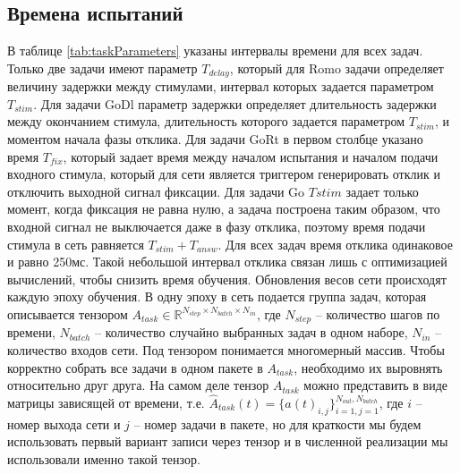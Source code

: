 \documentclass{article}
\begin{document}
\subsection{Времена испытаний}\label{label:times}
В таблице \ref{tab:taskParameters} указаны интервалы времени для всех задач. Только две задачи имеют параметр $T_{delay}$, который для Romo задачи определяет величину задержки между стимулами, интервал которых задается параметром $T_{stim}$. Для задачи GoDl параметр задержки определяет длительность задержки между окончанием стимула, длительность которого задается параметром $T_{stim}$, и моментом начала фазы отклика. Для задачи GoRt в первом столбце указано время $T_{fix}$, который задает время между началом испытания и началом подачи входного стимула, который для сети является триггером генерировать отклик и отключить выходной сигнал фиксации. Для задачи Go $T{stim}$ задает только момент, когда фиксация не равна нулю, а задача построена таким образом, что входной сигнал не выключается даже в фазу отклика, поэтому время подачи стимула в сеть равняется $T_{stim} + T_{answ}$. Для всех задач время отклика одинаковое и равно 250мс. Такой небольшой интервал отклика связан лишь с оптимизацией вычислений, чтобы снизить время обучения. Обновления весов сети происходят каждую эпоху обучения. В одну эпоху в сеть подается группа задач, которая описывается тензором $A_{task} \in \mathbb{R}^{N_{step} \times N_{batch} \times N_{in}}$, где $N_{step}$ -- количество шагов по времени, $N_{batch}$ -- количество случайно выбранных задач в одном наборе, $N_{in}$ -- количество входов сети. Под тензором понимается многомерный массив. Чтобы корректно собрать все задачи в одном пакете в $A_{task}$, необходимо их выровнять относительно друг друга. На самом деле тензор $A_{task}$ можно представить в виде матрицы зависящей от времени, т.е. $\hat A_{task}(t) =\{a(t)_{i, j}\}_{i=1, j=1}^{N_{out}, N_{batch}}$, где $i$ -- номер выхода сети и $j$ -- номер задачи в пакете, но для краткости мы будем использовать первый вариант записи через тензор и в численной реализации мы использовали именно такой тензор.
\end{document}
